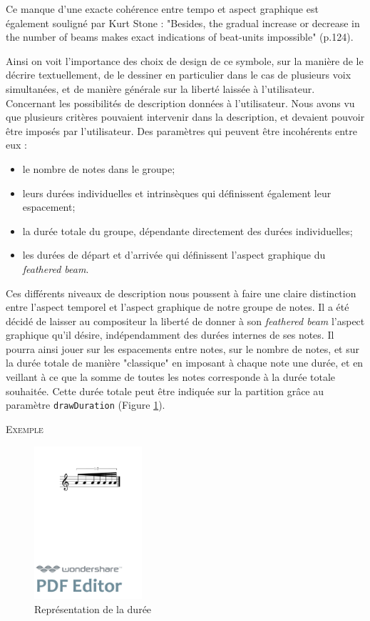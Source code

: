 \documentclass{article}
\newenvironment{gmncode}	{\vspace{-2mm}\small\verbatim}{\endverbatim\vspace{-2mm}}
\newcommand{\code}[1]		{{\small \texttt{#1}}}
\newcommand{\exemple}		{\vspace{2mm}\hspace*{-6mm}\textsc{Exemple}}
\begin{document}
Ce manque d'une exacte cohérence entre tempo et aspect graphique est également souligné par Kurt Stone \cite{stone1980music} : "Besides, the gradual increase or decrease in the number of beams makes exact indications of beat-units impossible" (p.124).

Ainsi on voit l'importance des choix de design de ce symbole, sur la manière de le décrire textuellement, de le dessiner en particulier dans le cas de plusieurs voix simultanées, et de manière générale sur la liberté laissée à l'utilisateur.
\\

Concernant les possibilités de description données à l'utilisateur. Nous avons vu que plusieurs critères pouvaient intervenir dans la description, et devaient pouvoir être imposés par l'utilisateur. Des paramètres qui peuvent être incohérents entre eux :
\begin{itemize}
\item le nombre de notes dans le groupe;
\item leurs durées individuelles et intrinsèques qui définissent également leur espacement;
\item la durée totale du groupe, dépendante directement des durées individuelles;
\item les durées de départ et d'arrivée qui définissent l'aspect graphique du \emph{feathered beam}.
\end{itemize}
\bigskip

Ces différents niveaux de description nous poussent à faire une claire distinction entre l'aspect temporel et l'aspect graphique de notre groupe de notes.  Il a été décidé de laisser au compositeur la liberté de donner à son \emph{feathered beam} l'aspect graphique qu'il désire, indépendamment des durées internes de ses notes. Il pourra ainsi jouer sur les espacements entre notes, sur le nombre de notes, et sur la durée totale de manière "classique" en imposant à chaque note une durée, et en veillant à ce que la somme de toutes les notes corresponde à la durée totale souhaitée. Cette durée totale peut être indiquée sur la partition grâce au paramètre \code{drawDuration} (Figure \ref{fig:fbeamduree}).

\exemple
\begin{figure}[h]
\centering
\begin{gmncode}
[ 
  \fBeam<drawDuration="true"> (
    a/8 a a/16 a a a/32 a
  )
]
\end{gmncode}
\includegraphics[width=40mm]{img/fbeamduree.pdf}
\caption{Représentation de la durée}
\label{fig:fbeamduree}
\end{figure}
\end{document}
